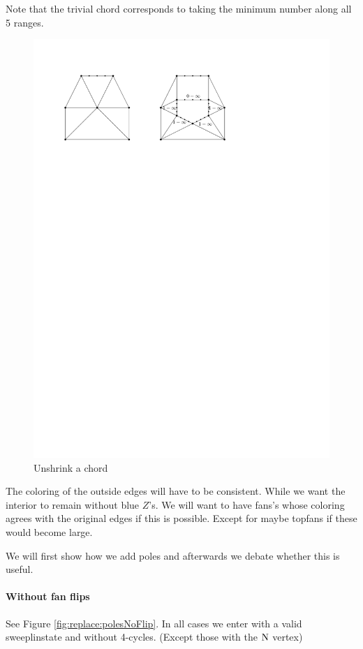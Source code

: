 Note that the trivial chord corresponds to taking the minimum number along all 5 ranges.
\begin{figure}[h]
  \centering
  \includegraphics[scale=1]{chordReplace/img/unshrunk}
  \caption{Unshrink a chord}
  \label{fig:replace:unshrunk}
\end{figure}


 The coloring of the outside edges will have to be consistent. While we want the interior to remain without blue $Z$'s. We will want to have fans's whose coloring agrees with the original edges if this is possible. Except for maybe topfans if these would become large.



We will first show how we add poles and afterwards we debate whether this is useful.

\paragraph{Without fan flips}
See Figure \ref{fig:replace:polesNoFlip}. In all cases we enter with a valid sweeplinstate and without 4-cycles. (Except those with the $\mathrm{N}$ vertex)

